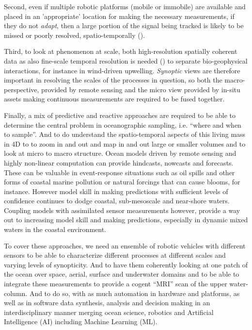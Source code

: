\documentclass[12pt]{article}
\begin{document}
Second, even if multiple robotic platforms (mobile or immobile) are
available and placed in an 'appropriate' location for making the
necessary measurements, if they do not \emph{adapt}, then a large
portion of the signal being tracked is likely to be missed or poorly
resolved, spatio-temporally ().

Third, to look at phenomenon at scale, both high-resolution spatially
coherent data as also fine-scale temporal resolution is needed
() to separate bio-geophysical interactions, for instance in
wind-driven upwelling. \emph{Synoptic} views are therefore important
in resolving the scales of the processes in question, so both the
macro- perspective, provided by remote sensing and the micro view
provided by in-situ assets making continuous measurements are required
to be fused together.

Finally, a mix of predictive and reactive approaches are required to
be able to determine the central problem in oceanographic sampling,
i.e. ``where and when to sample''. And to do understand the
spatio-temporal aspects of this living mass in 4D to to zoom in and
out and map in and out large or smaller volumes and to look at micro
to macro structure. Ocean models driven by remote sensing and highly
non-linear computation can provide hindcasts, nowcasts and
forecasts. These can be valuable in event-response situations such as
oil spills and other forms of coastal marine pollution or natural
forcings that can cause blooms, for instance. However model skill in
making predictions with sufficient levels of confidence continues to
dodge coastal, sub-mesoscale and near-shore waters. Coupling models
with assimilated sensor measurements however, provide a way out to
increasing model skill and making predictions, especially in dynamic
mixed waters in the coastal environment.

To cover these approaches, we need an ensemble of robotic vehicles
with different sensors to be able to characterize different processes
at different scales and varying levels of synopticity. And to have
them coherently looking at one patch of the ocean over space, aerial,
surface and underwater domains and to be able to integrate
these measurements to provide a cogent ``MRI'' scan of the upper
water-column. And to do so, with as much automation in hardware and
platforms, as well as in software data synthesis, analysis and
decision making in an interdisciplinary manner merging ocean science,
robotics and Artificial Intelligence (AI) including Machine Learning
(ML). 
\end{document}
